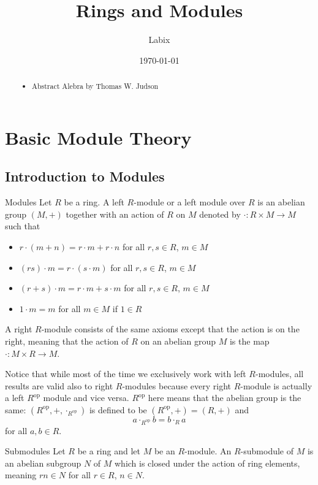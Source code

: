 \documentclass[a4paper]{article}
\title{Rings and Modules}
\author{Labix}
\date{\today}
\begin{document}
\maketitle
\begin{abstract}
\begin{itemize}
\item Abstract Alebra by Thomas W. Judson
\end{itemize}
\end{abstract}
\pagebreak
\tableofcontents

\pagebreak
\section{Basic Module Theory}
\subsection{Introduction to Modules}
\begin{defn}{Modules}{} Let $R$ be a ring. A left $R$-module or a left module over $R$ is an abelian group $(M,+)$ together with an action of $R$ on $M$ denoted by $\cdot:R\times M\to M$ such that 
\begin{itemize}
\item $r\cdot (m+n)=r\cdot m+r\cdot n$ for all $r,s\in R$, $m\in M$
\item $(rs)\cdot m=r\cdot (s\cdot m)$ for all $r,s\in R$, $m\in M$
\item $(r+s)\cdot m=r\cdot m+s\cdot m$ for all $r,s\in R$, $m\in M$
\item $1\cdot m=m$ for all $m\in M$ if $1\in R$
\end{itemize}
A right $R$-module consists of the same axioms except that the action is on the right, meaning that the action of $R$ on an abelian group $M$ is the map $\cdot:M\times R\to M$. 
\end{defn}

Notice that while most of the time we exclusively work with left $R$-modules, all results are valid also to right $R$-modules because every right $R$-module is actually a left $R^{\text{op}}$ module and vice versa. $R^{\text{op}}$ here means that the abelian group is the same: $(R^{\text{op}},+,\cdot_{R^\text{op}})$ is defined to be $(R^\text{op},+)=(R,+)$ and $$a\cdot_{R^{\text{op}}}b=b\cdot_R a$$ for all $a,b\in R$. 

\begin{defn}{Submodules}{} Let $R$ be a ring and let $M$ be an $R$-module. An $R$-submodule of $M$ is an abelian subgroup $N$ of $M$ which is closed under the action of ring elements, meaning $rn\in N$ for all $r\in R$, $n\in N$. 
\end{defn}
\end{document}
